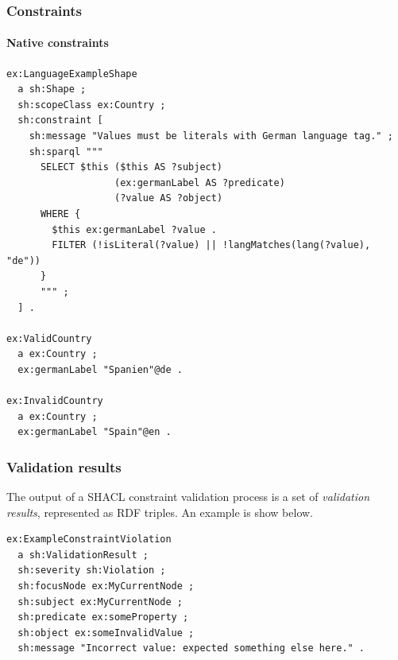 \documentclass{beamer}
\begin{document}
\begin{frame}[fragile]
  \frametitle{Constraints}
  \framesubtitle{Native constraints}

  \begin{Verbatim}[fontsize=\scriptsize]
ex:LanguageExampleShape
  a sh:Shape ;
  sh:scopeClass ex:Country ;
  sh:constraint [
    sh:message "Values must be literals with German language tag." ;
    sh:sparql """
      SELECT $this ($this AS ?subject)
                   (ex:germanLabel AS ?predicate)
                   (?value AS ?object)
      WHERE {
        $this ex:germanLabel ?value .
        FILTER (!isLiteral(?value) || !langMatches(lang(?value), "de"))
      }
      """ ;
  ] .

ex:ValidCountry
  a ex:Country ;
  ex:germanLabel "Spanien"@de .

ex:InvalidCountry
  a ex:Country ;
  ex:germanLabel "Spain"@en .
  \end{Verbatim}
\end{frame}

\begin{frame}[fragile]
  \frametitle{Validation results}

  The output of a SHACL constraint validation process is a set of
  \textit{validation results}, represented as RDF triples. An example is show
  below.

  \begin{Verbatim}[fontsize=\footnotesize]
ex:ExampleConstraintViolation
  a sh:ValidationResult ;
  sh:severity sh:Violation ;
  sh:focusNode ex:MyCurrentNode ;
  sh:subject ex:MyCurrentNode ;
  sh:predicate ex:someProperty ;
  sh:object ex:someInvalidValue ;
  sh:message "Incorrect value: expected something else here." .
  \end{Verbatim}
\end{frame}
\end{document}
